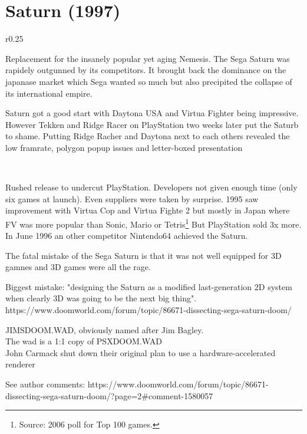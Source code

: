 \section{Saturn (1997)}
\begin{wrapfigure}[8]{r}{0.25\textwidth}{
\centering {}}
\end{wrapfigure}
Replacement for the insanely popular yet aging Nemesis.
The Sega Saturn was rapidely outgunned by its competitors. It brought back the dominance on the japanase market which Sega wanted so much but also precipited the collapse of its international empire.\\
\par
 Saturn got a good start with Daytona USA and Virtua Fighter being impressive. However Tekken and Ridge Racer on PlayStation two weeks later put the Saturb to shame. Putting Ridge Racher and Daytona next to each others revealed the low framrate, polygon popup issues and letter-boxed presentation\\
\par
{}\\
\par
Rushed release to undercut PlayStation. Developers not given enough time (only six games at launch). Even suppliers were taken by surprise. 1995 saw improvement with Virtua Cop and Virtua Fighte 2 but mostly in Japan where FV was more popular than Sonic, Mario or Tetris\footnote{Source: 2006 poll for Top 100 games.} But PlayStation sold 3x more. In June 1996 an other competitor Nintendo64 achieved the Saturn.
\par
The fatal mistake of the Sega Saturn is that it was not well equipped for 3D gamnes and 3D games were all the rage.
\par
Biggest mistake: "designing the Saturn as a modified last-generation 2D system when clearly 3D was going to be the next big thing".\\
https://www.doomworld.com/forum/topic/86671-dissecting-sega-saturn-doom/\\
\par
JIMSDOOM.WAD, obviously named after Jim Bagley.\\
The wad is a 1:1 copy of PSXDOOM.WAD\\
John Carmack shut down their original plan to use a hardware-accelerated renderer\\
\par
See author comments: https://www.doomworld.com/forum/topic/86671-dissecting-sega-saturn-doom/?page=2\#comment-1580057\\


